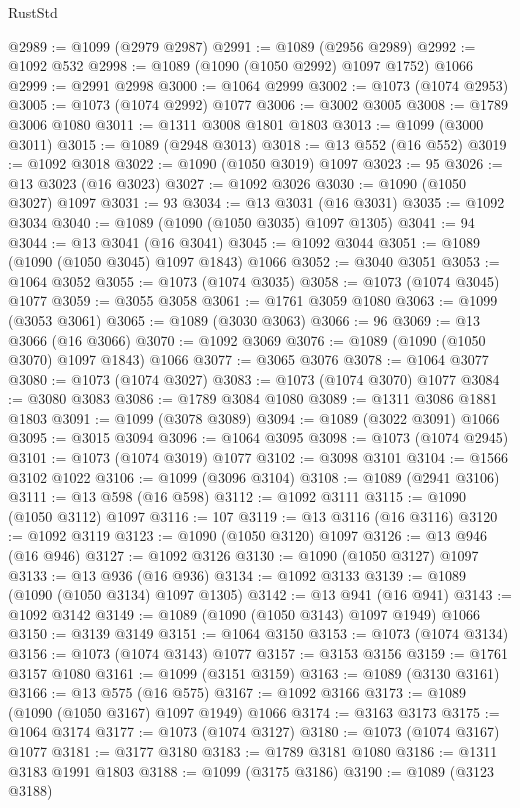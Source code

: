 \begin{lexlean}{RustStd}
\begin{coremodule}
{\begin{coremodule}
{{{{{{{{{{{{{{@2989 := @1099 (@2979 @2987)
@2991 := @1089 (@2956 @2989)
@2992 := @1092 @532
@2998 := @1089 (@1090 (@1050 @2992) @1097 @1752) @1066
@2999 := @2991 @2998
@3000 := @1064 @2999
@3002 := @1073 (@1074 @2953)
@3005 := @1073 (@1074 @2992) @1077
@3006 := @3002 @3005
@3008 := @1789 @3006 @1080
@3011 := @1311 @3008 @1801 @1803
@3013 := @1099 (@3000 @3011)
@3015 := @1089 (@2948 @3013)
@3018 := @13 @552 (@16 @552)
@3019 := @1092 @3018
@3022 := @1090 (@1050 @3019) @1097
@3023 := 95
@3026 := @13 @3023 (@16 @3023)
@3027 := @1092 @3026
@3030 := @1090 (@1050 @3027) @1097
@3031 := 93
@3034 := @13 @3031 (@16 @3031)
@3035 := @1092 @3034
@3040 := @1089 (@1090 (@1050 @3035) @1097 @1305)
@3041 := 94
@3044 := @13 @3041 (@16 @3041)
@3045 := @1092 @3044
@3051 := @1089 (@1090 (@1050 @3045) @1097 @1843) @1066
@3052 := @3040 @3051
@3053 := @1064 @3052
@3055 := @1073 (@1074 @3035)
@3058 := @1073 (@1074 @3045) @1077
@3059 := @3055 @3058
@3061 := @1761 @3059 @1080
@3063 := @1099 (@3053 @3061)
@3065 := @1089 (@3030 @3063)
@3066 := 96
@3069 := @13 @3066 (@16 @3066)
@3070 := @1092 @3069
@3076 := @1089 (@1090 (@1050 @3070) @1097 @1843) @1066
@3077 := @3065 @3076
@3078 := @1064 @3077
@3080 := @1073 (@1074 @3027)
@3083 := @1073 (@1074 @3070) @1077
@3084 := @3080 @3083
@3086 := @1789 @3084 @1080
@3089 := @1311 @3086 @1881 @1803
@3091 := @1099 (@3078 @3089)
@3094 := @1089 (@3022 @3091) @1066
@3095 := @3015 @3094
@3096 := @1064 @3095
@3098 := @1073 (@1074 @2945)
@3101 := @1073 (@1074 @3019) @1077
@3102 := @3098 @3101
@3104 := @1566 @3102 @1022
@3106 := @1099 (@3096 @3104)
@3108 := @1089 (@2941 @3106)
@3111 := @13 @598 (@16 @598)
@3112 := @1092 @3111
@3115 := @1090 (@1050 @3112) @1097
@3116 := 107
@3119 := @13 @3116 (@16 @3116)
@3120 := @1092 @3119
@3123 := @1090 (@1050 @3120) @1097
@3126 := @13 @946 (@16 @946)
@3127 := @1092 @3126
@3130 := @1090 (@1050 @3127) @1097
@3133 := @13 @936 (@16 @936)
@3134 := @1092 @3133
@3139 := @1089 (@1090 (@1050 @3134) @1097 @1305)
@3142 := @13 @941 (@16 @941)
@3143 := @1092 @3142
@3149 := @1089 (@1090 (@1050 @3143) @1097 @1949) @1066
@3150 := @3139 @3149
@3151 := @1064 @3150
@3153 := @1073 (@1074 @3134)
@3156 := @1073 (@1074 @3143) @1077
@3157 := @3153 @3156
@3159 := @1761 @3157 @1080
@3161 := @1099 (@3151 @3159)
@3163 := @1089 (@3130 @3161)
@3166 := @13 @575 (@16 @575)
@3167 := @1092 @3166
@3173 := @1089 (@1090 (@1050 @3167) @1097 @1949) @1066
@3174 := @3163 @3173
@3175 := @1064 @3174
@3177 := @1073 (@1074 @3127)
@3180 := @1073 (@1074 @3167) @1077
@3181 := @3177 @3180
@3183 := @1789 @3181 @1080
@3186 := @1311 @3183 @1991 @1803
@3188 := @1099 (@3175 @3186)
@3190 := @1089 (@3123 @3188)
}}}}}}}}}}}}}}
\end{coremodule}}
\end{coremodule}
\end{lexlean}
